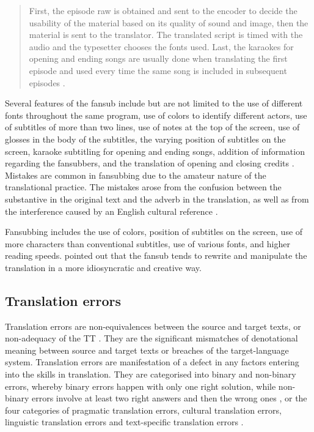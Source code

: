 \documentclass[english]{textolivre}
\begin{document}
\begin{quote}
    First, the episode raw is obtained and sent to the encoder to decide the usability of the material based on its quality of sound and image, then the material is sent to the translator. The translated script is timed with the audio and the typesetter chooses the fonts used. Last, the karaokes for opening and ending songs are usually done when translating the first episode and used every time the same song is included in subsequent episodes \cite[p. 39]{diaz-cintas_fansubs:_2006}. 
\end{quote}

Several features of the fansub include but are not limited to the use of different fonts throughout the same program, use of colors to identify different actors, use of subtitles of more than two lines, use of notes at the top of the screen, use of glosses in the body of the subtitles, the varying position of subtitles on the screen, karaoke subtitling for opening and ending songs, addition of information regarding the fansubbers, and the translation of opening and closing credits \cite{diaz-cintas_fansubs:_2006,chaume_turn_2013}. Mistakes are common in fansubbing due to the amateur nature of the translational practice. The mistakes arose from the confusion between the substantive in the original text and the adverb in the translation, as well as from the interference caused by an English cultural reference \cite{diaz-cintas_fansubs:_2006}.

Fansubbing includes the use of colors, position of subtitles on the screen, use of more characters than conventional subtitles, use of various fonts, and higher reading speeds. \textcite{cai_fansubbing_2015} pointed out that the fansub tends to rewrite and manipulate the translation in a more idiosyncratic and creative way. 

\subsection{Translation errors}\label{sec-format-simple}
Translation errors are non-equivalences between the source and target texts, or non-adequacy of the TT \cite{hansen_translation_2010}. They are the significant mismatches of denotational meaning between source and target texts or breaches of the target-language system. Translation errors are manifestation of a defect in any factors entering into the skills in translation. They are categorised into binary and non-binary errors, whereby binary errors happen with only one right solution, while non-binary errors involve at least two right answers and then the wrong ones \cite{pym_1992}, or the four categories of pragmatic translation errors, cultural translation errors, linguistic translation errors and text-specific translation errors \cite{nord_translation_2001}.
\end{document}
